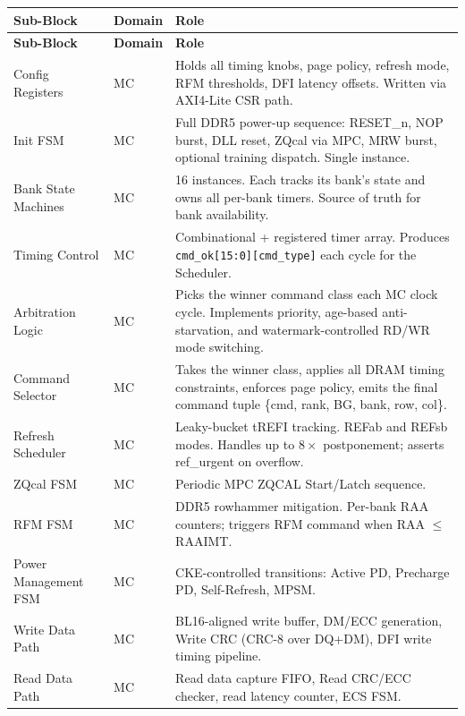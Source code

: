 \documentclass[11pt,a4paper]{article}
\newcommand{\sig}[1]{\textcolor{ddrteal}{\texttt{#1}}}
\begin{document}
\begin{longtable}{L{3.4cm} L{2cm} L{9.1cm}}
\toprule
\textbf{Sub-Block} & \textbf{Domain} & \textbf{Role} \\
\midrule
\endfirsthead
\toprule\textbf{Sub-Block}&\textbf{Domain}&\textbf{Role}\\\midrule\endhead
\bottomrule\endfoot

Config Registers     & MC & Holds all timing knobs, page policy, refresh mode, RFM
                            thresholds, DFI latency offsets. Written via AXI4-Lite CSR path. \\
Init FSM             & MC & Full DDR5 power-up sequence: RESET\_n, NOP burst, DLL reset,
                            ZQcal via MPC, MRW burst, optional training dispatch. Single instance. \\
Bank State Machines  & MC & 16 instances. Each tracks its bank's state and owns all
                            per-bank timers. Source of truth for bank availability. \\
Timing Control       & MC & Combinational + registered timer array. Produces
                            \sig{cmd\_ok[15:0][cmd\_type]} each cycle for the Scheduler. \\
Arbitration Logic    & MC & Picks the winner command class each MC clock cycle.
                            Implements priority, age-based anti-starvation, and watermark-controlled
                            RD/WR mode switching. \\
Command Selector     & MC & Takes the winner class, applies all DRAM timing constraints,
                            enforces page policy, emits the final command tuple
                            \{cmd, rank, BG, bank, row, col\}. \\
Refresh Scheduler    & MC & Leaky-bucket tREFI tracking. REFab and REFsb modes.
                            Handles up to $8\times$ postponement; asserts ref\_urgent on overflow. \\
ZQcal FSM            & MC & Periodic MPC ZQCAL Start/Latch sequence. \\
RFM FSM              & MC & DDR5 rowhammer mitigation. Per-bank RAA counters;
                            triggers RFM command when RAA $\leq$ RAAIMT. \\
Power Management FSM & MC & CKE-controlled transitions: Active PD, Precharge PD,
                            Self-Refresh, MPSM. \\
Write Data Path      & MC & BL16-aligned write buffer, DM/ECC generation, Write CRC
                            (CRC-8 over DQ+DM), DFI write timing pipeline. \\
Read Data Path       & MC & Read data capture FIFO, Read CRC/ECC checker,
                            read latency counter, ECS FSM. \\
\end{longtable}
\end{document}
